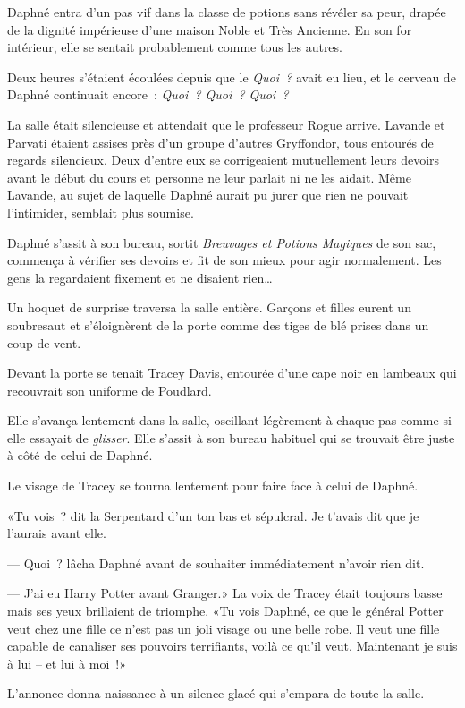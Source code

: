 Daphné entra d'un pas vif dans la classe de potions sans révéler sa peur, drapée de la dignité impérieuse d'une maison Noble et Très Ancienne. En son for intérieur, elle se sentait probablement comme tous les autres.

Deux heures s'étaient écoulées depuis que le \emph{Quoi~?} avait eu lieu, et le cerveau de Daphné continuait encore~: \emph{Quoi~? Quoi~? Quoi~?}

La salle était silencieuse et attendait que le professeur Rogue arrive. Lavande et Parvati étaient assises près d'un groupe d'autres Gryffondor, tous entourés de regards silencieux. Deux d'entre eux se corrigeaient mutuellement leurs devoirs avant le début du cours et personne ne leur parlait ni ne les aidait. Même Lavande, au sujet de laquelle Daphné aurait pu jurer que rien ne pouvait l'intimider, semblait plus soumise.

Daphné s'assit à son bureau, sortit \emph{Breuvages et Potions Magiques} de son sac, commença à vérifier ses devoirs et fit de son mieux pour agir normalement. Les gens la regardaient fixement et ne disaient rien…

Un hoquet de surprise traversa la salle entière. Garçons et filles eurent un soubresaut et s'éloignèrent de la porte comme des tiges de blé prises dans un coup de vent.

Devant la porte se tenait Tracey Davis, entourée d'une cape noir en lambeaux qui recouvrait son uniforme de Poudlard.

Elle s'avança lentement dans la salle, oscillant légèrement à chaque pas comme si elle essayait de \emph{glisser}. Elle s'assit à son bureau habituel qui se trouvait être juste à côté de celui de Daphné.

Le visage de Tracey se tourna lentement pour faire face à celui de Daphné.

«Tu vois~? dit la Serpentard d'un ton bas et sépulcral. Je t'avais dit que je l'aurais avant elle.

--- Quoi~? lâcha Daphné avant de souhaiter immédiatement n'avoir rien dit.

--- J'ai eu Harry Potter avant Granger.» La voix de Tracey était toujours basse mais ses yeux brillaient de triomphe. «Tu vois Daphné, ce que le général Potter veut chez une fille ce n'est pas un joli visage ou une belle robe. Il veut une fille capable de canaliser ses pouvoirs terrifiants, voilà ce qu'il veut. Maintenant je suis à lui -- et lui à moi~!»

L'annonce donna naissance à un silence glacé qui s'empara de toute la salle.

